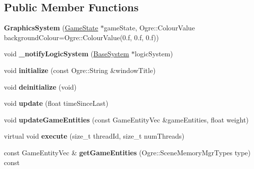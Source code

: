 \subsection*{Public Member Functions}
\begin{DoxyCompactItemize}
\item 
\mbox{\label{class_common_1_1_graphics_system_a640e8520e276805c15f12d340a7b6090}} 
{\bfseries Graphics\+System} (\hyperlink{class_common_1_1_game_state}{Game\+State} $\ast$game\+State, Ogre\+::\+Colour\+Value background\+Colour=Ogre\+::\+Colour\+Value(0.f, 0.f, 0.f))
\item 
\mbox{\label{class_common_1_1_graphics_system_a1bbb04c3ab640d4753f852d17a419df0}} 
void {\bfseries \+\_\+notify\+Logic\+System} (\hyperlink{class_common_1_1_base_system}{Base\+System} $\ast$logic\+System)
\item 
\mbox{\label{class_common_1_1_graphics_system_ad6aec10b001fbfc10cd86cd009615745}} 
void {\bfseries initialize} (const Ogre\+::\+String \&window\+Title)
\item 
\mbox{\label{class_common_1_1_graphics_system_ade2d4efd6e535d312818a92230eb7dcf}} 
void {\bfseries deinitialize} (void)
\item 
\mbox{\label{class_common_1_1_graphics_system_ab2c01af1a20132c37964f34f7dfb645c}} 
void {\bfseries update} (float time\+Since\+Last)
\item 
\mbox{\label{class_common_1_1_graphics_system_a9cabbf2ae25610cfa006d45a95f77d6a}} 
void {\bfseries update\+Game\+Entities} (const Game\+Entity\+Vec \&game\+Entities, float weight)
\item 
\mbox{\label{class_common_1_1_graphics_system_af262817d8290de7fe06e88e424bd5588}} 
virtual void {\bfseries execute} (size\+\_\+t thread\+Id, size\+\_\+t num\+Threads)
\item 
\mbox{\label{class_common_1_1_graphics_system_af658d1a3d1037affc4bce8a63ea33514}} 
const Game\+Entity\+Vec \& {\bfseries get\+Game\+Entities} (Ogre\+::\+Scene\+Memory\+Mgr\+Types type) const

\end{DoxyCompactItemize}

